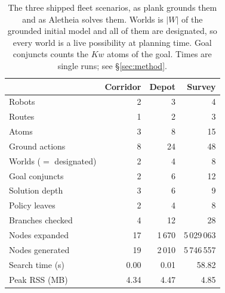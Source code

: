 \begin{table}[H]
\centering
\small
\caption{The three shipped fleet scenarios, as \textsf{plank} grounds them and
as Aletheia solves them. Worlds is $|W|$ of the grounded initial model and all
of them are designated, so every world is a live possibility at planning time.
Goal conjuncts counts the $\mathit{Kw}$ atoms of the goal. Times are single
runs; see \S\ref{sec:method}.}
\label{tab:fleet-scenarios}
\begin{tabular}{@{}l r r r@{}}
\toprule
 & \textbf{Corridor} & \textbf{Depot} & \textbf{Survey} \\
\midrule
Robots                  & 2   & 3    & 4      \\
Routes                  & 1   & 2    & 3      \\
Atoms                   & 3   & 8    & 15     \\
Ground actions          & 8   & 24   & 48     \\
Worlds ($=$ designated) & 2   & 4    & 8      \\
Goal conjuncts          & 2   & 6    & 12     \\
\midrule
Solution depth          & 3   & 6    & 9      \\
Policy leaves           & 2   & 4    & 8      \\
Branches checked        & 4   & 12   & 28     \\
\midrule
Nodes expanded          & 17  & 1\,670 & 5\,029\,063 \\
Nodes generated         & 19  & 2\,010 & 5\,746\,557 \\
Search time (s)         & 0.00 & 0.01 & 58.82  \\
Peak RSS (MB)           & 4.34 & 4.47 & 4.85   \\
\bottomrule
\end{tabular}
\end{table}
